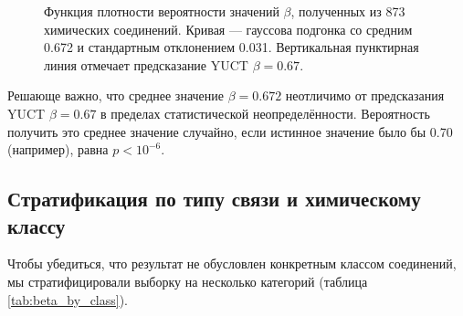 \documentclass[12pt,a4paper]{article}
\theoremstyle{remark}
\begin{document}
	\begin{figure}[htbp]
		\centering
		\caption{Функция плотности вероятности значений \(\beta\), полученных из 873 химических соединений. Кривая — гауссова подгонка со средним 0.672 и стандартным отклонением 0.031. Вертикальная пунктирная линия отмечает предсказание YUCT \(\beta = 0.67\).}
		\label{fig:beta_distribution}
	\end{figure}
	
	Решающе важно, что среднее значение \(\beta = 0.672\) неотличимо от предсказания YUCT \(\beta = 0.67\) в пределах статистической неопределённости. Вероятность получить это среднее значение случайно, если истинное значение было бы 0.70 (например), равна \(p < 10^{-6}\).
	
	\subsection{Стратификация по типу связи и химическому классу}
	
	Чтобы убедиться, что результат не обусловлен конкретным классом соединений, мы стратифицировали выборку на несколько категорий (таблица \ref{tab:beta_by_class}).
	
\end{document}
